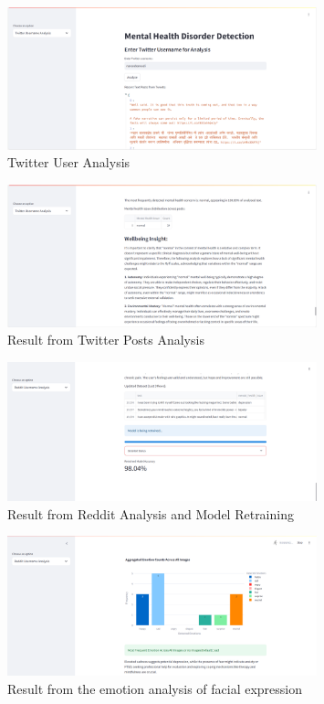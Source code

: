 \begin{figure}[h!]  
    \centering
    \includegraphics[width=0.8\textwidth]{App Images/08 Interface.png}  
    \caption{Twitter User Analysis}
    \label{09i}  %
\end{figure}

\begin{figure}[h!]  
    \centering
    \includegraphics[width=0.8\textwidth]{App Images/10 Interface.png}  
    \caption{Result from Twitter Posts Analysis}
    \label{10i}  %
\end{figure}

\begin{figure}[h!]  
    \centering
    \includegraphics[width=0.8\textwidth]{App Images/17 Interface.png}  
    \caption{Result from Reddit Analysis and Model Retraining}
    \label{10i}  %
\end{figure}

\begin{figure}[h!]  
    \centering
    \includegraphics[width=0.8\textwidth]{App Images/12-1 Interface.png}  
    \caption{Result from the emotion analysis of facial expression}
    \label{10i23}  %
\end{figure}

